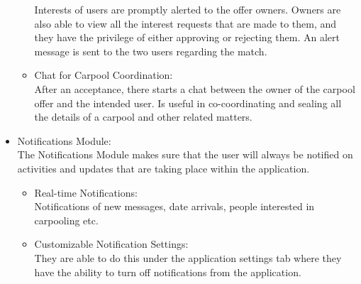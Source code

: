 \begin{itemize}
\begin{itemize}
Interests of users are promptly alerted to the offer owners.
Owners are also able to view all the interest requests that are made to them, and they have the privilege of either approving or rejecting them.
An alert message is sent to the two users regarding the match.
\item Chat for Carpool Coordination: \\
After an acceptance, there starts a chat between the owner of the carpool offer and the intended user.
Is useful in co-coordinating and sealing all the details of a carpool and other related matters.
\end{itemize}
    \item Notifications Module: \\
The Notifications Module makes sure that the user will always be notified on activities and updates that are taking place within the application.
    \begin{itemize}
    \item Real-time Notifications: \\
Notifications of new messages, date arrivals, people interested in carpooling etc.
\item Customizable Notification Settings: \\
They are able to do this under the application settings tab where they have the ability to turn off notifications from the application.
    \end{itemize}
\end{itemize}

